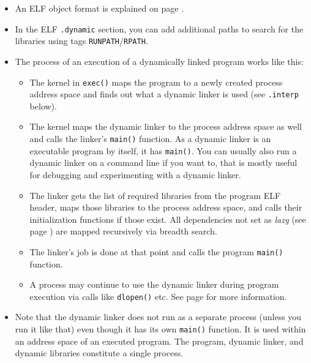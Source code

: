 \begin{itemize}
\item An ELF object format is explained on page \pageref{ELF}.
\item In the ELF \texttt{.dynamic} section, you can add additional paths to
search for the libraries using tags \texttt{RUNPATH}/\texttt{RPATH}.
\item The process of an execution of a dynamically linked program works like
this:
\begin{itemize}
\item The kernel in \texttt{exec()} maps the program to a newly created process
address space and finds out what a dynamic linker is used (see \texttt{.interp}
below).
\item The kernel maps the dynamic linker to the process address space as well
and calls the linker's \texttt{main()} function.  As a dynamic linker is an
executable program by itself, it has \texttt{main()}.  You can usually also run
a dynamic linker on a command line if you want to, that is mostly useful for
debugging and experimenting with a dynamic linker.
\item The linker gets the list of required libraries from the program ELF header,
maps those libraries to the process address space, and calls their initialization
functions if those exist.  All dependencies not set as 
\emph{lazy} (see page \pageref{DLOPEN}) are mapped recursively via breadth
search.
\item The linker's job is done at that point and calls the program
\texttt{main()} function.
\item A process may continue to use the dynamic linker during program execution
via calls like \texttt{dlopen()} etc.  See page \pageref{DLOPEN} for more
information.
\end{itemize}
\item Note that the dynamic linker does not run as a separate process (unless
you run it like that) even though it has its own \texttt{main()} function.  It is
used within an address space of an executed program.  The program, dynamic
linker, and dynamic libraries constitute a single process.


\end{itemize}
